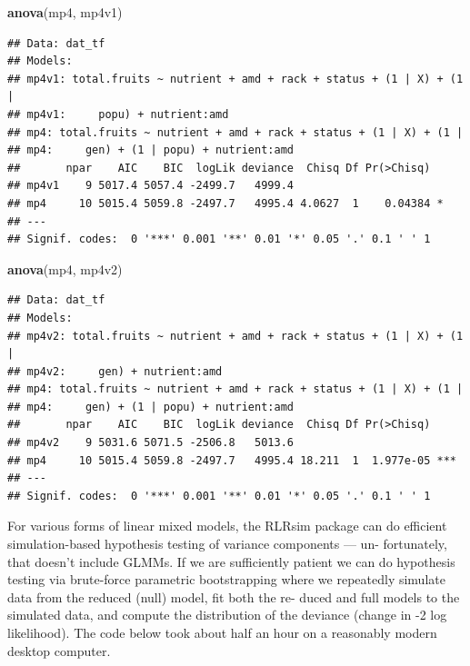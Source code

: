 \documentclass[
  12pt,
]{book}
\newenvironment{Shaded}{\begin{snugshade}}{\end{snugshade}}
\newcommand{\KeywordTok}[1]{\textcolor[rgb]{0.13,0.29,0.53}{\textbf{#1}}}
\newcommand{\NormalTok}[1]{#1}
\begin{document}
\begin{Shaded}
\begin{Highlighting}[]
\KeywordTok{anova}\NormalTok{(mp4, mp4v1)}
\end{Highlighting}
\end{Shaded}

\begin{verbatim}
## Data: dat_tf
## Models:
## mp4v1: total.fruits ~ nutrient + amd + rack + status + (1 | X) + (1 | 
## mp4v1:     popu) + nutrient:amd
## mp4: total.fruits ~ nutrient + amd + rack + status + (1 | X) + (1 | 
## mp4:     gen) + (1 | popu) + nutrient:amd
##       npar    AIC    BIC  logLik deviance  Chisq Df Pr(>Chisq)  
## mp4v1    9 5017.4 5057.4 -2499.7   4999.4                       
## mp4     10 5015.4 5059.8 -2497.7   4995.4 4.0627  1    0.04384 *
## ---
## Signif. codes:  0 '***' 0.001 '**' 0.01 '*' 0.05 '.' 0.1 ' ' 1
\end{verbatim}

\begin{Shaded}
\begin{Highlighting}[]
\KeywordTok{anova}\NormalTok{(mp4, mp4v2)}
\end{Highlighting}
\end{Shaded}

\begin{verbatim}
## Data: dat_tf
## Models:
## mp4v2: total.fruits ~ nutrient + amd + rack + status + (1 | X) + (1 | 
## mp4v2:     gen) + nutrient:amd
## mp4: total.fruits ~ nutrient + amd + rack + status + (1 | X) + (1 | 
## mp4:     gen) + (1 | popu) + nutrient:amd
##       npar    AIC    BIC  logLik deviance  Chisq Df Pr(>Chisq)    
## mp4v2    9 5031.6 5071.5 -2506.8   5013.6                         
## mp4     10 5015.4 5059.8 -2497.7   4995.4 18.211  1  1.977e-05 ***
## ---
## Signif. codes:  0 '***' 0.001 '**' 0.01 '*' 0.05 '.' 0.1 ' ' 1
\end{verbatim}

For various forms of linear mixed models, the RLRsim package can do efficient simulation-based hypothesis testing of variance components --- un- fortunately, that doesn't include GLMMs.
If we are sufficiently patient we can do hypothesis testing via brute-force parametric bootstrapping where we repeatedly simulate data from the reduced (null) model, fit both the re- duced and full models to the simulated data, and compute the distribution of the deviance (change in -2 log likelihood).
The code below took about half an hour on a reasonably modern desktop computer.
\end{document}
